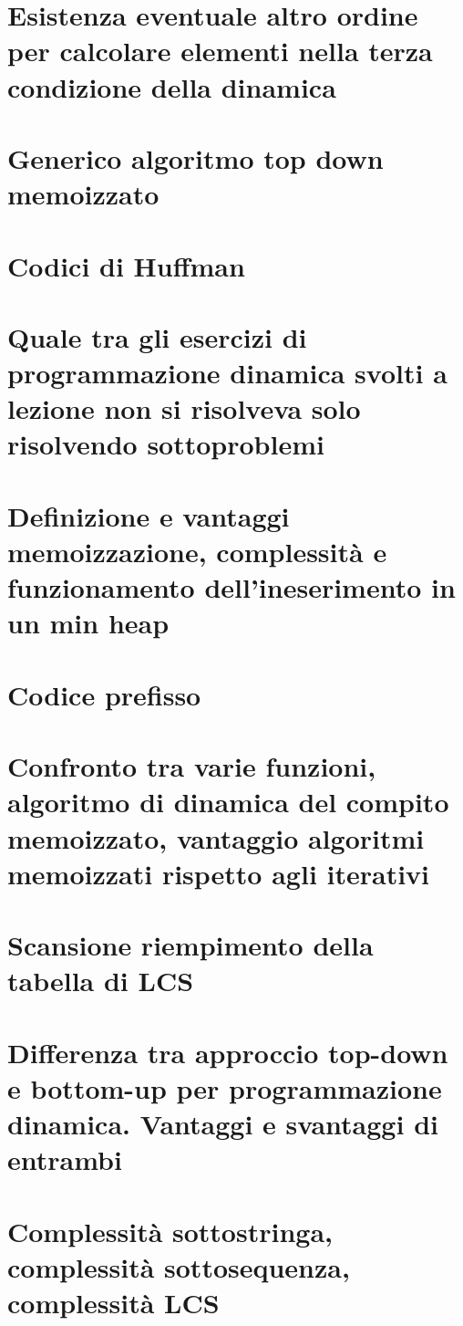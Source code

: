\documentclass[12pt,oneside,a4paper]{article}
\begin{document}
\section{Esistenza eventuale altro ordine per calcolare elementi nella terza condizione della dinamica}
\section{Generico algoritmo top down memoizzato}
\section{Codici di Huffman}
\section{Quale tra gli esercizi di programmazione dinamica svolti a lezione non si risolveva solo risolvendo sottoproblemi}
\section{Definizione e vantaggi memoizzazione, complessità e funzionamento dell'ineserimento in un min heap}
\section{Codice prefisso}
\section{Confronto tra varie funzioni, algoritmo di dinamica del compito memoizzato, vantaggio algoritmi memoizzati rispetto agli iterativi}
\section{Scansione riempimento della tabella di LCS}
\section{Differenza tra approccio top-down e bottom-up per programmazione dinamica. Vantaggi e svantaggi di entrambi}
\section{Complessità sottostringa, complessità sottosequenza, complessità LCS}
\end{document}
